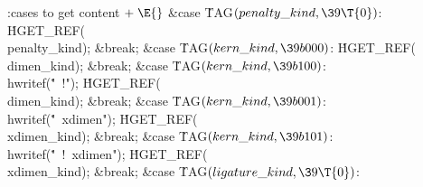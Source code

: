 \getcode
\Y\B\4:cases to get content\X${}\mathrel+\E{}$\6
\4\&{case} \.{TAG}${}(\index{penalty kind+\\{penalty\_kind}}\\{penalty\_kind},\39\T{0}){}$:\5
\.{HGET\_REF}(\\{penalty\_kind});\5
\&{break};\6
\4\&{case} \.{TAG}${}(\index{kern kind+\\{kern\_kind}}\\{kern\_kind},\39\\{b000}){}$:\5
\.{HGET\_REF}(\\{dimen\_kind});\5
\&{break};\6
\4\&{case} \.{TAG}${}(\index{kern kind+\\{kern\_kind}}\\{kern\_kind},\39\\{b100}){}$:\5
\\{hwritef}(\.{"\ !"});\5
\.{HGET\_REF}(\\{dimen\_kind});\5
\&{break};\6
\4\&{case} \.{TAG}${}(\index{kern kind+\\{kern\_kind}}\\{kern\_kind},\39\\{b001}){}$:\5
\\{hwritef}(\.{"\ xdimen"});\5
\.{HGET\_REF}(\\{xdimen\_kind});\5
\&{break};\6
\4\&{case} \.{TAG}${}(\index{kern kind+\\{kern\_kind}}\\{kern\_kind},\39\\{b101}){}$:\5
\\{hwritef}(\.{"\ !\ xdimen"});\5
\.{HGET\_REF}(\\{xdimen\_kind});\5
\&{break};\6
\4\&{case} \.{TAG}${}(\index{ligature kind+\\{ligature\_kind}}\\{ligature\_kind},\39\T{0}){}$:\5
